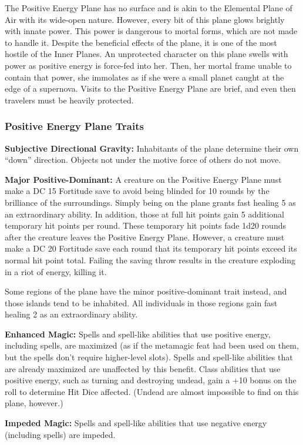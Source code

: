 The Positive Energy Plane has no surface and is akin to the Elemental Plane of Air with its wide-open nature. However, every bit of this plane glows brightly with innate power. This power is dangerous to mortal forms, which are not made to handle it. Despite the beneficial effects of the plane, it is one of the most hostile of the Inner Planes. An unprotected character on this plane swells with power as positive energy is force-fed into her. Then, her mortal frame unable to contain that power, she immolates as if she were a small planet caught at the edge of a supernova. Visits to the Positive Energy Plane are brief, and even then travelers must be heavily protected.

\subsubsection{Positive Energy Plane Traits}
\begin{itemize*}
\item \textbf{Subjective Directional Gravity:} Inhabitants of the plane determine their own ``down'' direction. Objects not under the motive force of others do not move.
\item \textbf{Major Positive-Dominant:} A creature on the Positive Energy Plane must make a DC 15 Fortitude save to avoid being blinded for 10 rounds by the brilliance of the surroundings. Simply being on the plane grants fast healing 5 as an extraordinary ability. In addition, those at full hit points gain 5 additional temporary hit points per round. These temporary hit points fade 1d20 rounds after the creature leaves the Positive Energy Plane. However, a creature must make a DC 20 Fortitude save each round that its temporary hit points exceed its normal hit point total. Failing the saving throw results in the creature exploding in a riot of energy, killing it.

Some regions of the plane have the minor positive-dominant trait instead, and those islands tend to be inhabited. All individuals in those regions gain fast healing 2 as an extraordinary ability.
\item \textbf{Enhanced Magic:} Spells and spell-like abilities that use positive energy, including  spells, are maximized (as if the  metamagic feat had been used on them, but the spells don't require higher-level slots). Spells and spell-like abilities that are already maximized are unaffected by this benefit. Class abilities that use positive energy, such as turning and destroying undead, gain a +10 bonus on the roll to determine Hit Dice affected. (Undead are almost impossible to find on this plane, however.)
\item \textbf{Impeded Magic:} Spells and spell-like abilities that use negative energy (including  spells) are impeded.
\end{itemize*}
